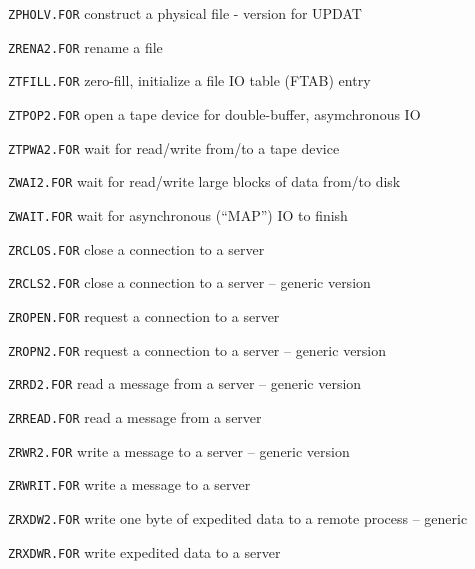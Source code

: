 {\item{\tt ZPHOLV.FOR} construct a physical file - version for UPDAT
\item{\tt ZRENA2.FOR} rename a file
\item{\tt ZTFILL.FOR} zero-fill, initialize a file IO table (FTAB) entry
\item{\tt ZTPOP2.FOR} open a tape device for double-buffer, asymchronous IO
\item{\tt ZTPWA2.FOR} wait for read/write from/to a tape device
\item{\tt ZWAI2.FOR} wait for read/write large blocks of data from/to disk
\item{\tt ZWAIT.FOR} wait for asynchronous (``MAP'') IO to finish

\medskip

\item{\tt ZRCLOS.FOR} close a connection to a server
\item{\tt ZRCLS2.FOR} close a connection to a server -- generic version
\item{\tt ZROPEN.FOR} request a connection to a server
\item{\tt ZROPN2.FOR} request a connection to a server -- generic version
\item{\tt ZRRD2.FOR} read a message from a server -- generic version
\item{\tt ZRREAD.FOR} read a message from a server
\item{\tt ZRWR2.FOR} write a message to a server -- generic version
\item{\tt ZRWRIT.FOR} write a message to a server
\item{\tt ZRXDW2.FOR} write one byte of expedited data to a remote process -- generic
\item{\tt ZRXDWR.FOR} write expedited data to a server

\medskip

}
